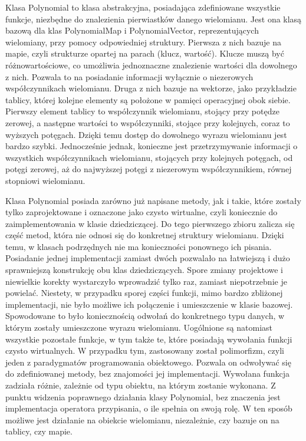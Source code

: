 \documentclass[twoside,a4paper]{book}
\begin{document}
Klasa Polynomial to klasa abstrakcyjna, posiadająca zdefiniowane wszystkie funkcje, niezbędne do znalezienia pierwiastków danego wielomianu. Jest ona klasą bazową dla klas PolynomialMap i PolynomialVector, reprezentujących wielomiany, przy pomocy odpowiedniej struktury. Pierwsza z nich bazuje na mapie, czyli strukturze opartej na parach (klucz, wartość). Klucze muszą być różnowartościowe, co umożliwia jednoznaczne znalezienie wartości dla dowolnego z nich. Pozwala to na posiadanie informacji wyłącznie o niezerowych współczynnikach wielomianu. Druga z nich bazuje na wektorze, jako przykładzie tablicy, której kolejne elementy są położone w pamięci operacyjnej obok siebie. Pierwszy element tablicy to współczynnik wielomianu, stojący przy potędze zerowej, a następne wartości to współczynniki, stojące przy kolejnych, coraz to wyższych potęgach. Dzięki temu dostęp do dowolnego wyrazu wielomianu jest bardzo szybki. Jednocześnie jednak, konieczne jest przetrzymywanie informacji o wszystkich współczynnikach wielomianu, stojących przy kolejnych potęgach, od potęgi zerowej, aż do najwyższej potęgi z niezerowym współczynnikiem, równej stopniowi wielomianu.

Klasa Polynomial posiada zarówno już napisane metody, jak i takie, które zostały tylko zaprojektowane i oznaczone jako czysto wirtualne, czyli koniecznie do zaimplementowania w klasie dziedziczącej. Do tego pierwszego zbioru zalicza się część metod, która nie odnosi się do konkretnej struktury wielomianu. Dzięki temu, w klasach podrzędnych nie ma konieczności ponownego ich pisania. Posiadanie jednej implementacji zamiast dwóch pozwalało na łatwiejszą i dużo sprawniejszą konstrukcję obu klas dziedziczących. Spore zmiany projektowe i niewielkie korekty wystarczyło wprowadzić tylko raz, zamiast niepotrzebnie je powielać. Niestety, w przypadku sporej części funkcji, mimo bardzo zbliżonej implementacji, nie było możliwe ich połączenie i umieszczenie w klasie bazowej. Spowodowane to było koniecznością odwołań do konkretnego typu danych, w którym zostały umieszczone wyrazu wielomianu. Uogólnione są natomiast wszystkie pozostałe funkcje, w tym także te, które posiadają wywołania funkcji czysto wirtualnych. W przypadku tym, zastosowany został polimorfizm, czyli jeden z paradygmatów programowania obiektowego. Pozwala on odwoływać się do zdefiniowanej metody, bez znajomości jej implementacji. Wywołana funkcja zadziała różnie, zależnie od typu obiektu, na którym zostanie wykonana. Z punktu widzenia poprawnego działania klasy Polynomial, bez znaczenia jest implementacja operatora przypisania, o ile spełnia on swoją rolę. W ten sposób możliwe jest działanie na obiekcie wielomianu, niezależnie, czy bazuje on na tablicy, czy mapie.
\end{document}
